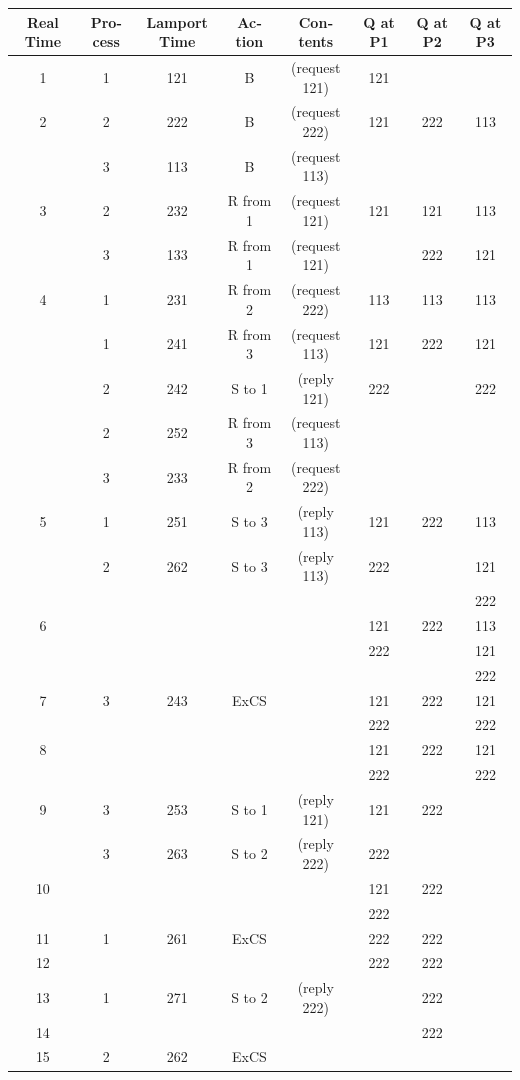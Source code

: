 \documentclass[paper=a4, fontsize=11pt]{article}
\numberwithin{equation}{section} %
\numberwithin{figure}{section} %
\numberwithin{table}{section} %
\begin{document}
\begin{latin}\begin{tabular}{| c | c | c | c | c | c | c | c |}
    \hline
    Real Time & Process & Lamport Time & Action & Contents & Q at P1 & Q at P2 & Q at P3 \\
    \hline
    1 & 1 & 121 & B & (request 121) & 121 & & \\
    \hline
    2 & 2 & 222 & B & (request 222) & 121 & 222 & 113 \\
      & 3 & 113 & B & (request 113) & & & \\
    \hline
    3 & 2 & 232 & R from 1 & (request 121) & 121 & 121 & 113 \\
      & 3 & 133 & R from 1 & (request 121) & & 222 & 121 \\
    \hline
    4 & 1 & 231 & R from 2 & (request 222) & 113 & 113 & 113 \\
      & 1 & 241 & R from 3 & (request 113) & 121 & 222 & 121 \\
      & 2 & 242 & S to 1   & (reply 121)   & 222 &     & 222 \\
      & 2 & 252 & R from 3 & (request 113) &     &     &     \\
      & 3 & 233 & R from 2 & (request 222) &     &     &     \\
    \hline
    5 & 1 & 251 & S to 3 & (reply 113) & 121 & 222  & 113 \\
      & 2 & 262 & S to 3 & (reply 113) & 222 &      & 121 \\
      &   &     &        &             &     &      & 222 \\
    \hline
    6 & & & & & 121 & 222  & 113 \\
      & & & & & 222 &      & 121 \\
      & & & & &     &      & 222 \\
    \hline
    7 & 3 & 243 & ExCS & & 121 & 222  & 121 \\
      &   &     &      & & 222 &      & 222 \\
    \hline
    8 & & & & & 121 & 222  & 121 \\
      & & & & & 222 &      & 222 \\
    \hline
    9 & 3 & 253 & S to 1 & (reply 121) & 121 & 222  & \\
      & 3 & 263 & S to 2 & (reply 222) & 222 &      & \\
    \hline
    10 & & & & & 121 & 222  & \\
       & & & & & 222 &      & \\
    \hline
    11 & 1 & 261 & ExCS & & 222 & 222 & \\
    \hline
    12 & & & & & 222 & 222 & \\
    \hline
    13 & 1 & 271 & S to 2 & (reply 222) & & 222 & \\
    \hline
    14 & & & & & & 222 & \\
    \hline
    15 & 2 & 262 & ExCS & & & & \\
    \hline

\end{tabular}\end{latin}
\end{document}
